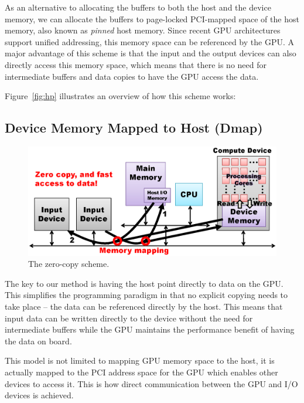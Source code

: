 As an alternative to allocating the buffers to both the host and the
device memory, we can allocate the buffers to page-locked PCI-mapped
space of the host memory, also known as \textit{pinned} host memory.
Since recent GPU architectures support unified addressing, this memory
space can be referenced by the GPU.
A major advantage of this scheme is that the input and the output
devices can also directly access this memory space, which means that
there is no need for intermediate buffers and data copies to have the
GPU access the data.

Figure~\ref{fig:hp} illustrates an overview of how this scheme works:

\subsection{Device Memory Mapped to Host (Dmap)}

\begin{figure}[!t]
 \centering
 \includegraphics[width=\hsize]{eps/dm.eps}
 \caption{The zero-copy {\dm} scheme.}
 \label{fig:dm}
\end{figure}


The key to our method is having the host point directly to data on the GPU.
This simplifies the programming paradigm in that no explicit copying needs
to take place -- the data can be referenced directly by the
host. This means that input data can be written directly to
the device without the need for intermediate buffers while the GPU
maintains the performance benefit of having the data on board.

This model is not limited to mapping GPU memory space to the host, it
is actually mapped to the PCI address space for the GPU which enables
other devices to access it. This is how direct communication
between the GPU and I/O devices is achieved.

